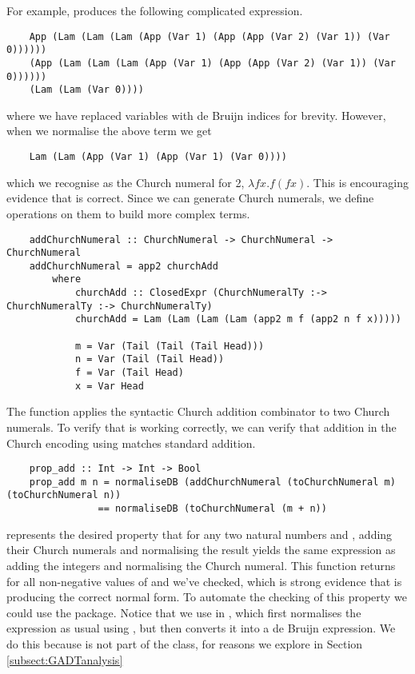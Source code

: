 For example,  produces the following complicated expression.

\begin{lstlisting}
    App (Lam (Lam (Lam (App (Var 1) (App (App (Var 2) (Var 1)) (Var 0)))))) 
    (App (Lam (Lam (Lam (App (Var 1) (App (App (Var 2) (Var 1)) (Var 0)))))) 
    (Lam (Lam (Var 0))))
\end{lstlisting}

where we have replaced  variables with de Bruijn indices for brevity. However, when we normalise the above term we get

\begin{lstlisting}
    Lam (Lam (App (Var 1) (App (Var 1) (Var 0))))
\end{lstlisting}

which we recognise as the Church numeral for 2, $\lambda f x . f (f x)$. This is encouraging evidence that  is correct. Since we can generate Church numerals, we define operations on them to build more complex terms.

\begin{lstlisting}
    addChurchNumeral :: ChurchNumeral -> ChurchNumeral -> ChurchNumeral
    addChurchNumeral = app2 churchAdd
        where
            churchAdd :: ClosedExpr (ChurchNumeralTy :-> ChurchNumeralTy :-> ChurchNumeralTy)
            churchAdd = Lam (Lam (Lam (Lam (app2 m f (app2 n f x)))))

            m = Var (Tail (Tail (Tail Head)))
            n = Var (Tail (Tail Head))
            f = Var (Tail Head)
            x = Var Head 
\end{lstlisting}

The  function applies the syntactic Church addition combinator  to two Church numerals. To verify that  is working correctly, we can verify that addition in the Church encoding using  matches standard addition. 

\begin{lstlisting}
    prop_add :: Int -> Int -> Bool
    prop_add m n = normaliseDB (addChurchNumeral (toChurchNumeral m) (toChurchNumeral n)) 
                == normaliseDB (toChurchNumeral (m + n))
\end{lstlisting}

 represents the desired property that for any two natural numbers  and , adding their Church numerals and normalising the result yields the same expression as adding the integers and normalising the Church numeral. This function returns  for all non-negative values of  and  we've checked, which is strong evidence that  is producing the correct normal form. To automate the checking of this property we could use the  package. Notice that we use  in , which first normalises the expression as usual using , but then converts it into a de Bruijn expression. We do this because  is not part of the  class, for reasons we explore in Section \ref{subsect:GADTanalysis}

